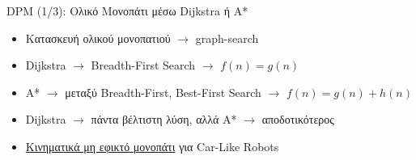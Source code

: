 \documentclass[10pt, compress]{beamer}
\begin{document}
\begin{frame}{DPM (1/3): Ολικό Μονοπάτι μέσω Dijkstra ή Α*}
	\begin{itemize}
		\item Κατασκευή ολικού μονοπατιού $\rightarrow$ graph-search
		\item Dijkstra $\rightarrow$ Breadth-First Search $\rightarrow$ $f(n)=g(n)$
		\item Α* $\rightarrow$ μεταξύ Breadth-First, Best-First Search $\rightarrow$ $f(n)=g(n)+h(n)$
		\item Dijkstra $\rightarrow$ πάντα βέλτιστη λύση, αλλά Α* $\rightarrow$ αποδοτικότερος
		\item \underline{Κινηματικά μη εφικτό μονοπάτι} για Car-Like Robots
	\end{itemize}
	\vspace{-0.2cm}
	\begin{figure}
		\captionsetup[subfigure]{labelformat=empty}
		\hspace{1cm}
	\end{figure}
\end{frame}
\end{document}
